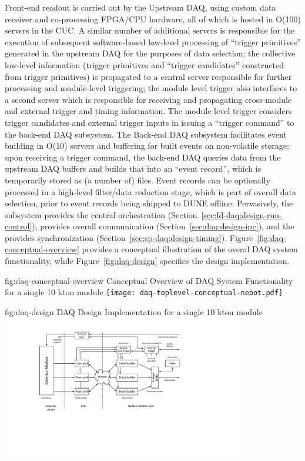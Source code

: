Front-end readout is carried out by the Upstream DAQ, using custom data receiver and
co-processing FPGA/CPU hardware, all of which is hosted in O(100) servers in the CUC. A
similar number of additional servers is responsible for the execution
of subsequent software-based low-level processing of ``trigger
primitives''
generated in the upstream DAQ for the purposes of data selection; the collective
low-level information (trigger primitives and ``trigger candidates''
constructed from trigger primitives) is propagated to a central server responsible
for further processing and module-level triggering; the module level
trigger also
interfaces to a second server which is responsible for receiving and
propagating cross-module and external trigger and timing
information. The module level trigger considers trigger candidates and
external trigger inputs in issuing a ``trigger command'' to the back-end DAQ
subsystem. The Back-end DAQ subsystem 
facilitates event building in O(10) servers and buffering for built
events on non-volatile storage; upon receiving a trigger command, the back-end DAQ queries
data from the upstream DAQ buffers and builds that into an ``event
record'', which is temporarily stored as (a number of) files. Event records can be optionally processed in a high-level
filter/data reduction stage, which is part of overall data selection,
 prior to event records being shipped to DUNE offline. Pervasively,
 the   subsystem provides the central orchestration
 (Section~\ref{sec:fd-daq:design-run-control}),  provides
 overall communication (Section~\ref{sec:daq:design-ipc}), and the
  provides synchronization
 (Section~\ref{sec:sp-daq:design-timing}). Figure~\ref{fig:daq-conceptual-overview}
 provides a conceptual illustration of the overal DAQ system
 functionality, while Figure~\ref{fig:daq-design}
specifies the design implementation. 

\begin{dunefigure}{fig:daq-conceptual-overview}{ Conceptual
   Overview of DAQ System Functionality for a single 10 kton module}
  \texttt{[image: daq-toplevel-conceptual-nebot.pdf]}
\end{dunefigure}

\begin{dunefigure}{fig:daq-design}{ DAQ Design
    Implementation for a single 10 kton module}
  \includegraphics[width=0.8\textwidth]{daq-overview.pdf}
\end{dunefigure}

